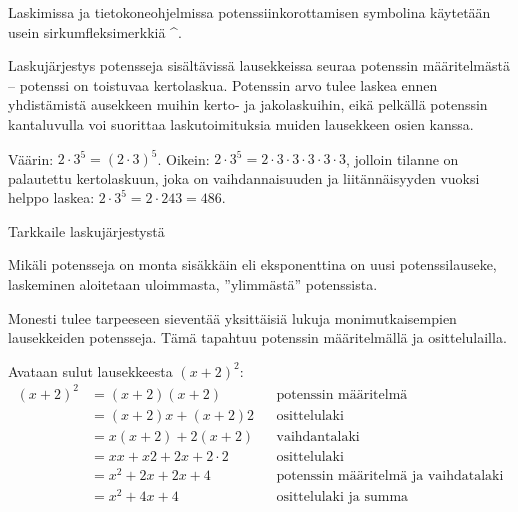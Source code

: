 Laskimissa ja tietokoneohjelmissa potenssiinkorottamisen symbolina käytetään usein sirkumfleksimerkkiä \^{}. %

Laskujärjestys potensseja sisältävissä lausekkeissa seuraa potenssin määritelmästä -- potenssi on toistuvaa kertolaskua. Potenssin arvo tulee laskea ennen yhdistämistä ausekkeen muihin kerto- ja jakolaskuihin, eikä pelkällä potenssin kantaluvulla voi suorittaa laskutoimituksia muiden lausekkeen osien kanssa.

\begin{esimerkki}
Väärin: $2\cdot 3^5 =(2\cdot 3)^5$. Oikein: $2\cdot 3^5=2\cdot 3\cdot 3\cdot 3\cdot 3\cdot 3$, jolloin tilanne on palautettu kertolaskuun, joka on vaihdannaisuuden ja liitännäisyyden vuoksi helppo laskea: $2\cdot 3^5=2\cdot 243=486$.
\end{esimerkki}

\begin{esimerkki}
Tarkkaile laskujärjestystä
\end{esimerkki}  

Mikäli potensseja on monta sisäkkäin eli eksponenttina on uusi potenssilauseke, laskeminen aloitetaan uloimmasta, ''ylimmästä'' potenssista. %

\begin{esimerkki}
\end{esimerkki}

Monesti tulee tarpeeseen sieventää yksittäisiä lukuja monimutkaisempien lausekkeiden potensseja. Tämä tapahtuu potenssin määritelmällä ja osittelulailla.
\begin{esimerkki}
 Avataan sulut lausekkeesta $(x+2)^2$:
	\begin{align*}
	(x+2)^2
	&=(x+2)(x+2) && \text{potenssin määritelmä} \\
	&=(x+2)x+(x+2)2 && \text{osittelulaki} \\
	&=x(x+2)+2(x+2) && \text{vaihdantalaki} \\
	&=xx+x2+2x+2\cdot2 && \text{osittelulaki} \\
	&=x^2+2x+2x+4 && \text{potenssin määritelmä ja vaihdatalaki} \\
	&=x^2+4x+4 && \text{osittelulaki ja summa}
	\end{align*}
\end{esimerkki} %

